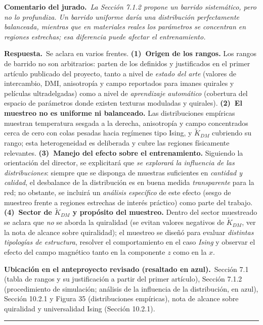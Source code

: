 \documentclass[11pt]{article}
\newcommand{\comentario}[1]{\par\smallskip\noindent\textbf{\color{jgris}Comentario del jurado.}\ \textit{#1}\par}
\newcommand{\respuesta}[1]{\par\smallskip\noindent\textbf{\color{jverde}Respuesta.}\ #1\par}
\newcommand{\ubic}[1]{\par\smallskip\noindent\textbf{\color{jazul}Ubicación en el anteproyecto revisado (resaltado en azul).}\ #1\par\medskip\hrule\medskip}
\begin{document}
\comentario{La Sección 7.1.2 propone un barrido sistemático, pero no lo profundiza. Un barrido uniforme daría una distribución perfectamente balanceada, mientras que en materiales reales los parámetros se concentran en regiones estrechas; esa diferencia puede afectar el entrenamiento.}
\respuesta{Se aclara en varios frentes. \textbf{(1)~Origen de los rangos.} Los rangos de barrido no son arbitrarios: parten de los definidos y justificados en el primer artículo publicado del proyecto, tanto a nivel de \emph{estado del arte} (valores de intercambio, DMI, anisotropía y campo reportados para imanes quirales y películas ultradelgadas) como a nivel de \emph{aprendizaje automático} (cobertura del espacio de parámetros donde existen texturas moduladas y quirales). \textbf{(2)~El muestreo no es uniforme ni balanceado.} Las distribuciones empíricas muestran temperatura sesgada a la derecha, anisotropía y campo concentrados cerca de cero con colas pesadas hacia regímenes tipo Ising, y $\tilde{K}_{DM}$ cubriendo su rango; esta heterogeneidad es deliberada y cubre las regiones físicamente relevantes. \textbf{(3)~Manejo del efecto sobre el entrenamiento.} Siguiendo la orientación del director, se explicitará que \emph{se explorará la influencia de las distribuciones}: siempre que se disponga de muestras suficientes en \emph{cantidad y calidad}, el desbalance de la distribución es en buena medida \emph{transparente} para la red; no obstante, se incluirá un \emph{análisis específico} de este efecto (sesgo de muestreo frente a regiones estrechas de interés práctico) como parte del trabajo. \textbf{(4)~Sector de $\tilde{K}_{DM}$ y propósito del muestreo.} Dentro del sector muestreado se aclara que \emph{no} se aborda la quiralidad (se evitan valores negativos de $\tilde{K}_{DM}$, ver la nota de alcance sobre quiralidad); el muestreo se diseñó para evaluar \emph{distintas tipologías de estructura}, resolver el comportamiento en el caso \emph{Ising} y observar el efecto del campo magnético tanto en la componente $z$ como en la $x$.}
\ubic{Sección 7.1 (tabla de rangos y su justificación a partir del primer artículo), Sección 7.1.2 (procedimiento de simulación; análisis de la influencia de la distribución, en azul), Sección 10.2.1 y Figura 35 (distribuciones empíricas), nota de alcance sobre quiralidad y universalidad Ising (Sección 10.2.1).}
\end{document}
